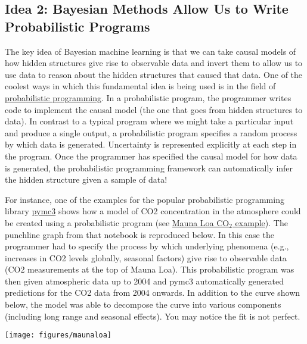 \documentclass[assignment01_Solutions]{subfiles}
\begin{document}
\subsection*{Idea 2: Bayesian Methods Allow Us to Write Probabilistic Programs}

The key idea of Bayesian machine learning is that we can take causal models of how hidden structures give rise to observable data and invert them to allow us to use data to reason about the hidden structures that caused that data.  One of the coolest ways in which this fundamental idea is being used is in the field of \href{https://en.wikipedia.org/wiki/Probabilistic_programming}{probabilistic programming}.  In a probabilistic program, the programmer writes code to implement the causal model (the one that goes from hidden structures to data).  In contrast to a typical program where we might take a particular input and produce a single output, a probabilistic program specifies a random process by which data is generated.  Uncertainty is represented explicitly at each step in the program.  Once the programmer has specified the causal model for how data is generated, the probabilistic programming framework can automatically infer the hidden structure given a sample of data!

For instance, one of the examples for the popular probabilistic programming library \href{https://docs.pymc.io/}{pymc3} shows how a model of CO2 concentration in the atmosphere could be created using a probabilistic program (see \href{https://docs.pymc.io/en/stable/pymc-examples/examples/gaussian_processes/GP-MaunaLoa.html}{Mauna Loa CO$_2$ example}).  The punchline graph from that notebook is reproduced below.  In this case the programmer had to specify the process by which underlying phenomena (e.g., increases in CO2 levels globally, seasonal factors) give rise to observable data (CO2 measurements at the top of Mauna Loa).  This probabilistic program was then given atmospheric data up to 2004 and pymc3 automatically generated predictions for the CO2 data from 2004 onwards.  In addition to the curve shown below, the model was able to decompose the curve into various components (including long range and seasonal effects).  You may notice the fit is not perfect.  

\begin{center}
\texttt{[image: figures/maunaloa]}
\end{center}
\end{document}
